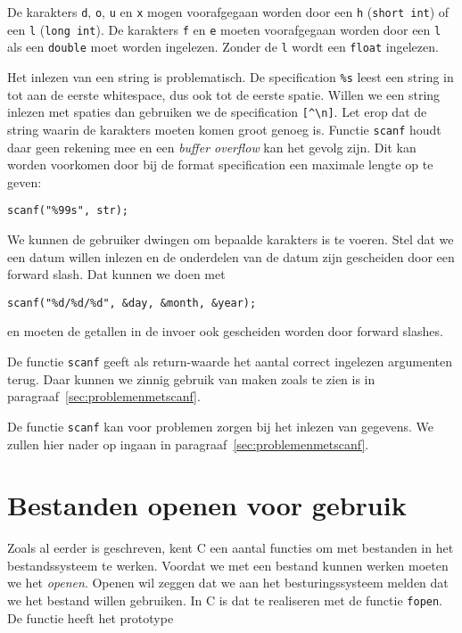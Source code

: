 De karakters \texttt{d}, \texttt{o}, \texttt{u} en \texttt{x} mogen voorafgegaan worden door een \texttt{h} (\texttt{short int}) of een \texttt{l} (\texttt{long int}). De karakters \texttt{f} en \texttt{e} moeten voorafgegaan worden door een \texttt{l} als een \texttt{double} moet worden ingelezen. Zonder de \texttt{l} wordt een \texttt{float} ingelezen.

Het inlezen van een string is problematisch. De specification \texttt{\%s} leest een string in tot aan de eerste whitespace, dus ook tot de eerste spatie. Willen we een string inlezen met spaties dan gebruiken we de specification \texttt{[\textasciicircum\textbackslash n]}. Let erop dat de string waarin de karakters moeten komen groot genoeg is. Functie \texttt{scanf} houdt daar geen rekening mee en een \textsl{buffer overflow} kan het gevolg zijn. Dit kan worden voorkomen door bij de format specification een maximale lengte op te geven:

\begin{lstlisting}[style=lstoneline]
scanf("%99s", str);
\end{lstlisting}

We kunnen de gebruiker dwingen om bepaalde karakters is te voeren. Stel dat we een datum willen inlezen en de onderdelen van de datum zijn gescheiden door een forward slash. Dat kunnen we doen met

\begin{lstlisting}[style=lstoneline]
scanf("%d/%d/%d", &day, &month, &year);
\end{lstlisting}

en moeten de getallen in de invoer ook gescheiden worden door forward slashes.

De functie \texttt{scanf} geeft als return-waarde het aantal correct ingelezen argumenten terug. Daar kunnen we zinnig gebruik van maken zoals te zien is in paragraaf~\ref{sec:problemenmetscanf}.

De functie \texttt{scanf} kan voor problemen zorgen bij het inlezen van gegevens. We zullen hier nader op ingaan in paragraaf~\ref{sec:problemenmetscanf}.



\section{Bestanden openen voor gebruik}
Zoals al eerder is geschreven, kent C een aantal functies om met bestanden in het bestandssysteem te werken. Voordat we met een bestand kunnen werken moeten we het \textsl{openen}. Openen wil zeggen dat we aan het besturingssysteem melden dat we het bestand willen gebruiken. In C is dat te realiseren met de functie \texttt{fopen}. De functie heeft het prototype

